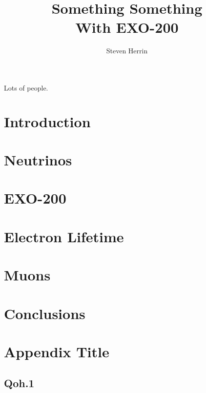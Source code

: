 \documentclass[12pt,twoside]{report}
\begin{document}
\title{Something Something\\
         With EXO-200}
\author{Steven Herrin}
 
\beforepreface



Lots of people.

\afterpreface
 
\chapter{Introduction}


\chapter{Neutrinos}
\label{ch:neutrinos}


\chapter{EXO-200}
\label{ch:detector}

\chapter{Electron Lifetime}
\label{ch:electronlifetime}


\chapter{Muons}
\label{ch:muons}


\chapter{Conclusions}


\appendix
\chapter{Appendix Title}

\section{Qoh.1}




\onlinesignature
\end{document}
